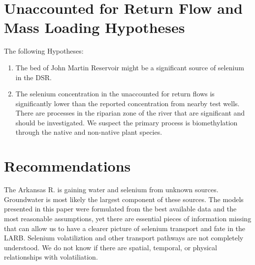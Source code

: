 \clearpage{}
\section{Unaccounted for Return Flow and Mass Loading Hypotheses}
\label{sec:FlowAndMassConclusions}

The following Hypotheses:
\begin{enumerate}
	\item The bed of John Martin Reservoir might be a significant source of selenium in the DSR.
	\item The selenium concentration in the unaccounted for return flows is significantly lower than the reported concentration from nearby test wells.  There are processes in the riparian zone of the river that are significant and should be investigated.  We suspect the primary process is biomethylation through the native and non-native plant species.
\end{enumerate}
\clearpage{}

\section{Recommendations}
\label{sec:Recommendations}

The Arkansas R. is gaining water and selenium from unknown sources.  Groundwater is most likely the largest component of these sources.  The models presented in this paper were formulated from the best available data and the most reasonable assumptions, yet there are essential pieces of information missing that can allow us to have a clearer picture of selenium transport and fate in the LARB.  Selenium volatiliztion and other transport pathways are not completely understood.  We do not know if there are spatial, temporal, or physical relationships with volatiliation.

